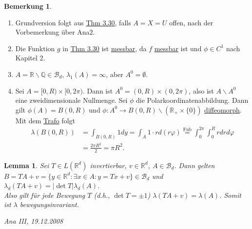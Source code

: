\documentclass[a4paper]{report}
\newcommand{\R}{\mathbb{R}}
\newcommand{\Q}{\mathbb{Q}}
\newcommand{\Borel}{\mathcal{B}}
\newcommand{\Bd}{\Borel_d}
\newcommand{\jlabel}[1]{\label{j_#1}}
\newcommand{\jhyperref}[2]{\hyperref[j_#1]{#2}}
\newcommand{\jlink}[1]{\jhyperref{#1}{#1}}
\newcommand{\jabb}[3]{ #1: #2 \rightarrow #3 }
\newcommand{\jshortlinkFubini}{\jhyperref{Fubini}{\text{Fub}}}
\newcommand{\jspacesmall}{\vspace{4pt}}
\newcommand{\jdate}[1]{\jspacesmall\begin{center}\jlabel{#1}\tiny{Ana III, #1}\end{center}}
\theoremstyle{plain}
\newtheorem{lem}[thm]{Lemma}
\theoremstyle{definition}
\newtheorem*{bem*}{Bemerkung}
\begin{document}
{{{{\begin{bem*}
    \begin{enumerate}
        \item Grundversion folgt aus \jlink{Thm 3.30}, falls $A=X=U$ offen, nach der Vorbemerkung über Ana2.
        \item Die Funktion $g$ in \jlink{Thm 3.30} ist \jlink{messbar}, da $f$ \jlink{messbar} ist und $\phi \in C^1$ nach Kapitel 2.
        \item $A = \R\backslash \Q\in \Bd$, $\lambda_1(A)=\infty$, aber $A^0 = \emptyset$.
        \item Sei $A=[0,R)\times [0,2\pi)$. Dann ist $A^0 = (0,R)\times (0,2\pi)$, also ist $A\backslash A^0$ eine zweidimensionale Nullmenge. Sei $\phi$ die Polarkoordinatenabbildung. Dann gilt $\phi(A) = B(0,R)$ und $\jabb{\phi}{A^0}{B(0,R)\backslash (\R_+ \times \{0\})}$ \jlink{diffeomorph}. Mit dem \jlink{Trafo} folgt
        \begin{displaymath}
            \begin{split}
                \lambda(B(0,R)) &= \int_{B(0,R)} 1 dy = \int_A 1 \cdot r d(r\varphi) \overset{\jshortlinkFubini}{=} \int_0^{2\pi}\int_0^R r dr d\varphi \\
                &= \frac{2\pi R^2}{2} = \pi R^2.
            \end{split}
        \end{displaymath}
    \end{enumerate}
\end{bem*}

\begin{lem}
    \jlabel{Lem 3.31}
    Sei $T\in L(\R^d)$ invertierbar, $v \in \R^d$, $A\in \Bd$. Dann gelten $B=TA + v = \{y\in \R^d : \exists x \in A : y = Tx + v\} \in \Bd$ und $\lambda_d(TA+v) = |\det T| \lambda_d(A)$.\\
    Also gilt für jede Bewegung $T$ (d.h., $\det T = \pm 1$) $\lambda(TA + v) = \lambda(A)$. Somit ist $\lambda$ bewegungsinvariant.
    
\jdate{19.12.2008}


\end{lem}}}}}
\end{document}
